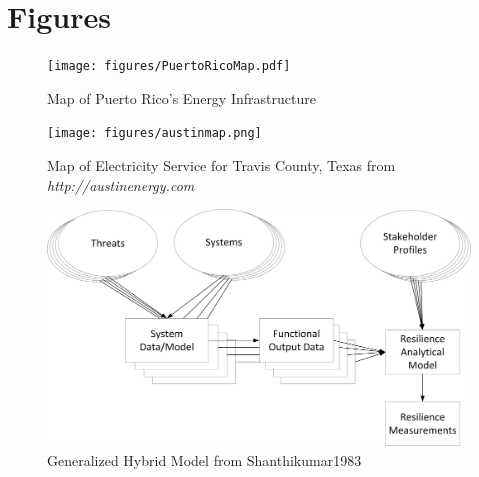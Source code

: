 

\pagebreak
\section*{Figures}


\begin{figure}[h]
\centerline{\texttt{[image: figures/PuertoRicoMap.pdf]}}
\caption{Map of Puerto Rico's Energy Infrastructure}
\label{f:PRMap}
\end{figure}
\pagebreak

\begin{figure}[h]
  \label{f:austinmap}
  \texttt{[image: figures/austinmap.png]}
  \caption{Map of Electricity Service for Travis County, Texas from \emph{http://austinenergy.com}}
\end{figure}
\pagebreak

\begin{figure}[h]
  \centerline{\includegraphics[width=6in]{figures/ClassIII.png}}
  \caption{Generalized Hybrid Model from Shanthikumar1983}
  \label{f:HybridModel}
\end{figure}
\pagebreak




